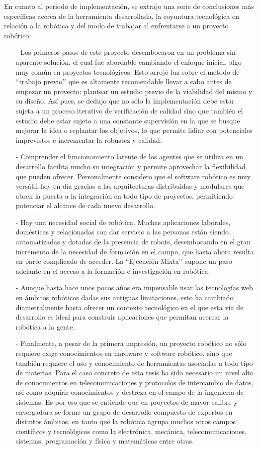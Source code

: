 En cuanto al periodo de implementación, se extrajo una serie de conclusiones más específicas acerca de la herramienta desarrollada, la coyuntura tecnológica en relación a la robótica y del modo de trabajar al enfrentarse a un proyecto robótico:
\begin{itemize}
    \item [-] Los primeros pasos de este proyecto desembocaron en un problema sin aparente solución, el cual fue abordable cambiando el enfoque inicial, algo muy común en proyectos tecnológicos. Esto arrojó luz sobre el método de ``trabajo previo’’ que es altamente recomendable llevar a cabo antes de empezar un proyecto: plantear un estudio previo de la viabilidad del mismo y su diseño. Así pues, se dedujo que no sólo la implementación debe estar sujeta a un proceso iterativo de verificación de calidad sino que también el estudio debe estar sujeto a una constante supervisión en la que se busque mejorar la idea o replantar los objetivos, lo que permite lidiar con potenciales imprevistos e incrementar la robustez y calidad.
    \item [-] Comprender el funcionamiento latente de los agentes que se utiliza en un desarrollo facilita mucho su integración y permite aprovechar la flexibilidad que pueden ofrecer. Personalmente considero que el software robótico es muy versátil hoy en día gracias a las arquitecturas distribuidas y modulares que abren la puerta a la integración en todo tipo de proyectos, permitiendo potenciar el alcance de cada nuevo desarrollo.
    \item [-] Hay una necesidad social de robótica. Muchas aplicaciones laborales, domésticas y relacionadas con dar servicio a las personas están siendo automatizadas y dotadas de la presencia de robots, desembocando en el gran incremento de la necesidad de formación en el campo, que hasta ahora resulta en parte complicado de acceder. La ``Ejecución Mixta’’ supone un paso adelante en el acceso a la formación e investigación en robótica.
    \item [-] Aunque hasta hace unos pocos años era impensable usar las tecnologías web en ámbitos robóticos dadas sus antiguas limitaciones, esto ha cambiado diametralmente hasta ofrecer un contexto tecnológico en el que esta vía de desarrollo es ideal para construir aplicaciones que permitan acercar la robótica a la gente.
    \item [-] Finalmente, a pesar de la primera impresión, un proyecto robótico no sólo requiere exige conocimientos en hardware y software robótico, sino que también requiere el uso y conocimiento de herramientas asociadas a todo tipo de materias. Para el caso concreto de esta tesis ha sido necesario un nivel alto de conocimientos en telecomunicaciones y protocolos de intercambio de datos, así como adquirir conocimientos y destreza en el campo de la ingeniería de sistemas. Es por eso que se entiende que en proyectos de mayor calibre y envergadura se forme un grupo de desarrollo compuesto de expertos en distintos ámbitos, en tanto que la robótica agrupa muchos otros campos científicos y tecnológicos como la electrónica, mecánica, telecomunicaciones, sistemas, programación y física y matemáticas entre otras.
\end{itemize}

